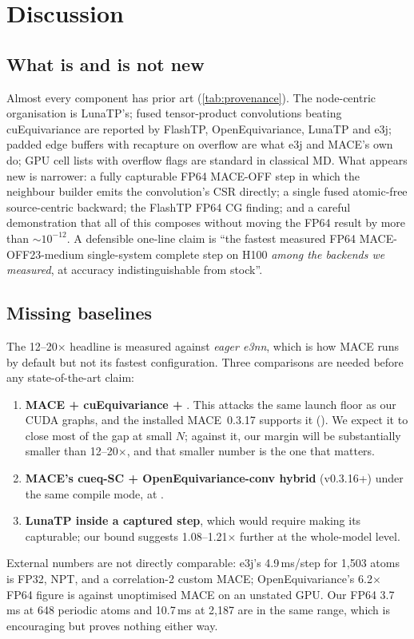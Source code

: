 \section{Discussion}
\label{sec:discussion}

\subsection{What is and is not new}
Almost every component has prior art (\cref{tab:provenance}). The node-centric organisation is LunaTP's; fused tensor-product convolutions beating cuEquivariance are reported by FlashTP, OpenEquivariance, LunaTP and e3j; padded edge buffers with recapture on overflow are what e3j and MACE's own  do; GPU cell lists with overflow flags are standard in classical MD. What appears new is narrower: a fully capturable FP64 MACE-OFF step in which the neighbour builder emits the convolution's CSR directly; a single fused atomic-free source-centric backward; the FlashTP FP64 CG finding; and a careful demonstration that all of this composes without moving the FP64 result by more than $\sim10^{-12}$. A defensible one-line claim is ``the fastest measured FP64 MACE-OFF23-medium single-system complete step on H100 \emph{among the backends we measured}, at accuracy indistinguishable from stock''.

\subsection{Missing baselines}
The 12--20$\times$ headline is measured against \emph{eager e3nn}, which is how MACE runs by default but not its fastest configuration. Three comparisons are needed before any state-of-the-art claim:
\begin{enumerate}
  \item \textbf{MACE + cuEquivariance + }. This attacks the same launch floor as our CUDA graphs, and the installed MACE~0.3.17 supports it (). We expect it to close most of the gap at small $N$; against it, our margin will be substantially smaller than 12--20$\times$, and that smaller number is the one that matters.
  \item \textbf{MACE's cueq-SC + OpenEquivariance-conv hybrid} (v0.3.16+) under the same compile mode, at \Btwo.
  \item \textbf{LunaTP inside a captured step}, which would require making its  capturable; our bound suggests 1.08--1.21$\times$ further at the whole-model level.
\end{enumerate}
External numbers are not directly comparable: e3j's 4.9\,ms/step for 1{,}503 atoms is FP32, NPT, and a correlation-2 custom MACE; OpenEquivariance's 6.2$\times$ FP64 figure is against unoptimised MACE on an unstated GPU. Our FP64 3.7\,ms at 648 periodic atoms and 10.7\,ms at 2{,}187 are in the same range, which is encouraging but proves nothing either way.

